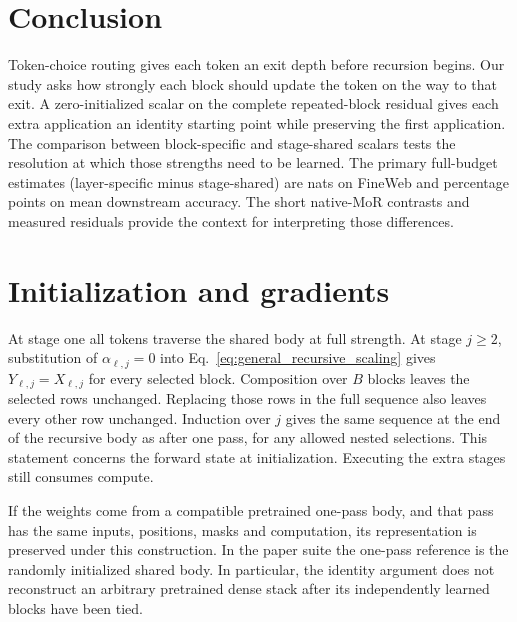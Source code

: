 \documentclass[11pt,letterpaper]{article}
\newcommand{\pending}{\textcolor{muted}{\textemdash}}
\begin{document}
\section{Conclusion}
Token-choice routing gives each token an exit depth before recursion begins. Our study asks how strongly each block should update the token on the way to that exit. A zero-initialized scalar on the complete repeated-block residual gives each extra application an identity starting point while preserving the first application. The comparison between block-specific and stage-shared scalars tests the resolution at which those strengths need to be learned. The primary full-budget estimates (layer-specific minus stage-shared) are \pending{} nats on FineWeb and \pending{} percentage points on mean downstream accuracy. The short native-MoR contrasts and measured residuals provide the context for interpreting those differences.


\appendix
\section{Initialization and gradients}
\label{app:proof}\label{app:rezero_recursion}
At stage one all tokens traverse the shared body at full strength. At stage \(j\ge2\), substitution of \(\alpha_{\ell,j}=0\) into Eq.~\eqref{eq:general_recursive_scaling} gives \(Y_{\ell,j}=X_{\ell,j}\) for every selected block. Composition over \(B\) blocks leaves the selected rows unchanged. Replacing those rows in the full sequence also leaves every other row unchanged. Induction over \(j\) gives the same sequence at the end of the recursive body as after one pass, for any allowed nested selections. This statement concerns the forward state at initialization. Executing the extra stages still consumes compute.

If the weights come from a compatible pretrained one-pass body, and that pass has the same inputs, positions, masks and computation, its representation is preserved under this construction. In the paper suite the one-pass reference is the randomly initialized shared body. In particular, the identity argument does not reconstruct an arbitrary pretrained dense stack after its independently learned blocks have been tied.
\end{document}
